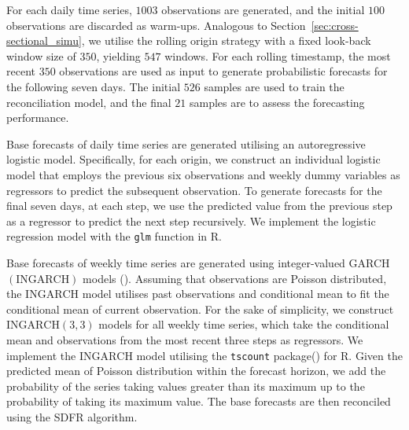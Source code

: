 \documentclass[a4paper,review,12pt,authoryear]{elsarticle}
\let\code=\texttt
\let\proglang=\textsf
\begin{document}
     For each daily time series, $1003$ observations are generated, and the initial $100$ observations are discarded as warm-ups. Analogous to Section~\ref{sec:cross-sectional_simu}, we utilise the rolling origin strategy with a fixed look-back window size of $350$, yielding $547$ windows.
     For each rolling timestamp, the most recent $350$ observations are used as input to generate probabilistic forecasts for the following seven days.
     The initial $526$ samples are used to train the reconciliation model, and the final $21$ samples are to assess the forecasting performance.

     Base forecasts of daily time series are generated utilising an autoregressive logistic model.
     Specifically, for each origin, we construct an individual logistic model that employs the previous six observations and weekly dummy variables as regressors to predict the subsequent observation.
     To generate forecasts for the final seven days, at each step, we use the predicted value from the previous step as a regressor to predict the next step recursively.
     We implement the logistic regression model with the \code{glm} function in \proglang{R}.

     Base forecasts of weekly time series are generated using integer-valued GARCH $(\textrm{INGARCH})$ models ().
     Assuming that observations are Poisson distributed, the $\textrm{INGARCH}$ model utilises past observations and conditional mean to fit the conditional mean of current observation.
     For the sake of simplicity, we construct $\textrm{INGARCH}(3, 3)$ models for all weekly time series, which take the conditional mean and observations from the most recent three steps as regressors.
     We implement the $\textrm{INGARCH}$ model utilising the \code{tscount} package() for \proglang{R}.
     Given the predicted mean of Poisson distribution within the forecast horizon, we add the probability of the series taking values greater than its maximum up to the probability of taking its maximum value.
     The base forecasts are then reconciled using the \textrm{SDFR} algorithm.
\end{document}
